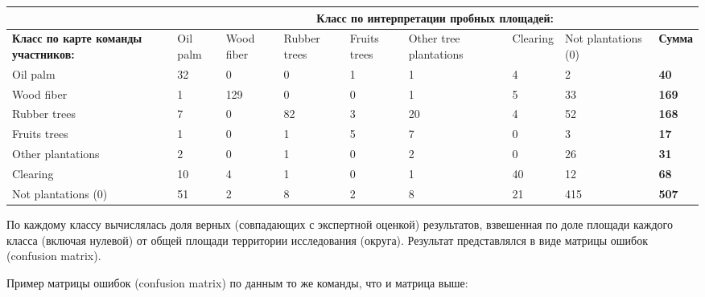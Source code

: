 \begin{center}
    \footnotesize
    \begin{tabular}{|p{2.8cm}|p{0.8cm}|p{0.8cm}|p{1cm}|p{0.9cm}|p{1.7cm}|p{1.2cm}|p{1.7cm}|p{1.1cm}|}
        \hline
         & \multicolumn{8}{c|}{\textbf{Класс по интерпретации пробных площадей:}} \\
        \hline
        \textbf{Класс по карте команды участников:} & Oil palm & Wood fiber & Rubber trees & 	Fruits trees & Other tree plantations & Clearing & Not plantations (0) &\textbf{Сумма} \\
        \hline
        Oil palm & 32 & 0 & 0 & 1 & 1 & 4 & 2 & \textbf{40} \\
        \hline
        Wood fiber & 1 & 129 & 0 & 0 & 1 & 5 & 33 & \textbf{169} \\
        \hline
        Rubber trees & 7 & 0 & 82 & 3 & 20 & 4 & 52 & \textbf{168} \\
        \hline
        Fruits trees & 1 & 0 & 1 & 5 & 7 & 0 & 3 & \textbf{17} \\
        \hline
        Other plantations & 2 & 0 & 1 & 0 & 2 & 0 & 26 & \textbf{31} \\
        \hline
        Clearing & 10 & 4 & 1 & 0 & 1 & 40 & 12 & \textbf{68} \\
        \hline
        Not plantations (0) & 51 & 2 & 8 & 2 & 8 & 21 & 415 & \textbf{507} \\
        \hline      
    \end{tabular}
\end{center}

По каждому классу вычислялась доля верных (совпадающих с экспертной оценкой) результатов, взвешенная по доле площади каждого класса (включая нулевой) от общей площади территории исследования (округа). Результат представлялся в виде матрицы ошибок (confusion matrix).

Пример матрицы ошибок (confusion matrix) по данным то же команды, что и матрица выше:

